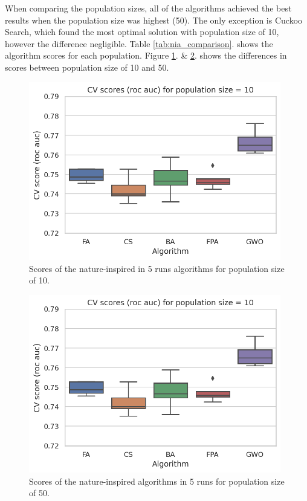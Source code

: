 \documentclass[runningheads]{llncs}
\begin{document}
When comparing the population sizes, all of the algorithms achieved the best results when the population size was highest (50). The only exception is Cuckoo Search, which found the most optimal solution with population size of 10, however the difference negligible. Table \ref{tab:nia_comparison}. shows the algorithm scores for each population. Figure \ref{fig:nia_train_score_by_algorithm_1}. \& \ref{fig:nia_train_score_by_algorithm_2}. shows the differences in scores between population size of 10 and 50.


\begin{figure}
    \centering
    \includegraphics[width=11cm]{figures/nia_train_score_by_algorithm_10}
    \caption{Scores of the nature-inspired in 5 runs algorithms for population size of 10.}
    \label{fig:nia_train_score_by_algorithm_1}
\end{figure}

\begin{figure}
    \centering
    \includegraphics[width=11cm]{figures/nia_train_score_by_algorithm_10}
    \caption{Scores of the nature-inspired algorithms in 5 runs for population size of 50.}
    \label{fig:nia_train_score_by_algorithm_2}
\end{figure}
\end{document}
